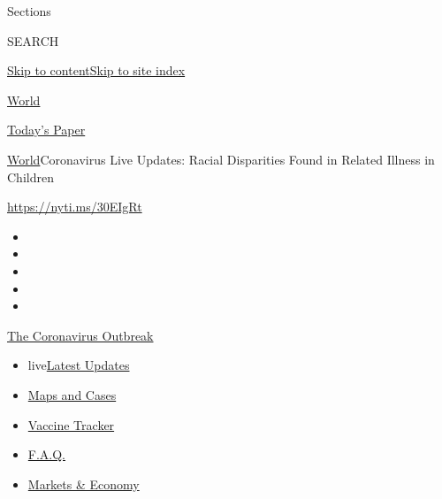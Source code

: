 Sections

SEARCH

\protect\hyperlink{site-content}{Skip to
content}\protect\hyperlink{site-index}{Skip to site index}

\href{https://www.nytimes.com/section/world}{World}

\href{https://myaccount.nytimes.com/auth/login?response_type=cookie\&client_id=vi}{}

\href{https://www.nytimes.com/section/todayspaper}{Today's Paper}

\href{/section/world}{World}\textbar{}Coronavirus Live Updates: Racial
Disparities Found in Related Illness in Children

\href{https://nyti.ms/30EIgRt}{https://nyti.ms/30EIgRt}

\begin{itemize}
\item
\item
\item
\item
\item
\end{itemize}

\href{https://www.nytimes.com/news-event/coronavirus?action=click\&pgtype=Article\&state=default\&region=TOP_BANNER\&context=storylines_menu}{The
Coronavirus Outbreak}

\begin{itemize}
\tightlist
\item
  live\href{https://www.nytimes.com/2020/08/08/world/coronavirus-updates.html?action=click\&pgtype=Article\&state=default\&region=TOP_BANNER\&context=storylines_menu}{Latest
  Updates}
\item
  \href{https://www.nytimes.com/interactive/2020/us/coronavirus-us-cases.html?action=click\&pgtype=Article\&state=default\&region=TOP_BANNER\&context=storylines_menu}{Maps
  and Cases}
\item
  \href{https://www.nytimes.com/interactive/2020/science/coronavirus-vaccine-tracker.html?action=click\&pgtype=Article\&state=default\&region=TOP_BANNER\&context=storylines_menu}{Vaccine
  Tracker}
\item
  \href{https://www.nytimes.com/interactive/2020/world/coronavirus-tips-advice.html?action=click\&pgtype=Article\&state=default\&region=TOP_BANNER\&context=storylines_menu}{F.A.Q.}
\item
  \href{https://www.nytimes.com/live/2020/08/07/business/stock-market-today-coronavirus?action=click\&pgtype=Article\&state=default\&region=TOP_BANNER\&context=storylines_menu}{Markets
  \& Economy}
\end{itemize}

